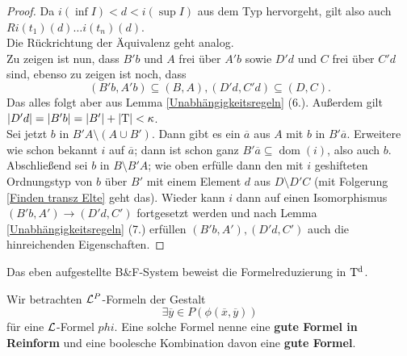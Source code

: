 \begin{proof}
	\newpage
	Da $i(\inf I)<d<i(\sup I)$ aus dem Typ hervorgeht, gilt also auch $Ri(t_1)(d)\dots i(t_n)(d)$.\\
	Die Rückrichtung der Äquivalenz geht analog.\\
	Zu zeigen ist nun, dass $B'b$ und $A$ frei über $A'b$ sowie $D'd$ und $C$ frei über $C'd$ sind, ebenso zu zeigen ist noch, dass $$(B'b,A'b)\subseteq(B,A),(D'd,C'd)\subseteq(D,C).$$ Das alles folgt aber aus Lemma \ref{Unabhängigkeitsregeln} (6.). Außerdem gilt ${\left| D'd \right|}={\left| B'b \right|}={\left| B' \right|}+{\left| \operatorname{T} \right|}<\kappa$.\\
	Sei jetzt $b$ in $B'A\setminus(A\cup B')$. Dann gibt es ein $\overline{a}$ aus $A$ mit $b$ in $B'\overline{a}$. Erweitere wie schon bekannt $i$ auf $\overline{a}$; dann ist schon ganz $B'\overline{a}\subseteq\operatorname{dom}(i)$, also auch $b$.\\
	Abschließend sei $b$ in $B\setminus B'A$;  wie oben erfülle dann den mit $i$ geshifteten Ordnungstyp von $b$ über $B'$ mit einem Element $d$ aus $D\setminus D'C$ (mit Folgerung \ref{Finden transz Elte} geht das). Wieder kann $i$ dann auf einen Isomorphismus $(B'b,A')\rightarrow(D'd,C')$ fortgesetzt werden und nach Lemma \ref{Unabhängigkeitsregeln} (7.) erfüllen $(B'b,A'),(D'd,C')$ auch die hinreichenden Eigenschaften.
\end{proof}

Das eben aufgestellte B\&F-System beweist die Formelreduzierung in $\operatorname{T^d}$.
\begin{definition}
	Wir betrachten $\mathcal{L}^P$-Formeln der Gestalt
	$$\exists\overline{y}\in P(\phi(\overline{x},\overline{y}))$$
	für eine $\mathcal{L}$-Formel $phi$. Eine solche Formel nenne eine \textbf{gute Formel in Reinform} und eine boolesche Kombination davon eine \textbf{gute Formel}.
\end{definition}

